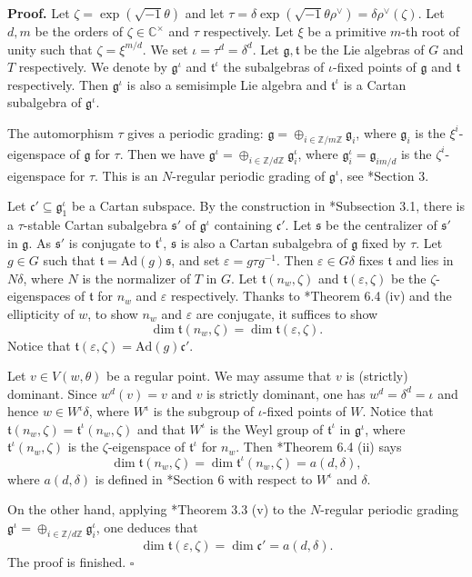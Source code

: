 \documentclass[10pt,leqno]{article}
\newcommand{\qed}{\hfill $\square$ \medskip}
\newenvironment{proof}[1][Proof]{\noindent\textbf{#1.} }{\qed}
\newcommand{\Ad}{\text{Ad}}
\renewcommand{\t}{\mathfrak t}
\def\fg{\mathfrak g}
\def\fc{\mathfrak c}
\def\ft{\mathfrak t}
\def\fs{\mathfrak s}
\def\d{\delta}
\def\t{\tau}
\def\z{\zeta}
\def\i{^{-1}}
\begin{document}
\begin{proof} Let $\zeta=\exp(\sqrt{-1} \theta)$ and let
$\t=\delta \exp(\sqrt{-1} \theta \rho^\vee)=\delta \rho^\vee(\zeta)$. Let $d,m$ be
the orders of $\zeta \in \mathbb C^\times$ and $\t$ respectively.
Let $\xi$ be a primitive $m$-th root of unity such that
$\zeta=\xi^{m/d}$. We set $\iota=\tau^d=\delta^d$. Let $\fg, \ft$ be
the Lie algebras of $G$ and $T$ respectively. We denote by
$\fg^\iota$ and $\ft^\iota$ the subalgebras of $\iota$-fixed points
of $\fg$ and $\ft$ respectively. Then $\fg^\iota$ is also a
semisimple Lie algebra and $\ft^\iota$ is a Cartan subalgebra of
$\fg^\iota$.

	The automorphism $\t$ gives a periodic grading: $\fg=\oplus_{i
\in \mathbb Z/m\mathbb Z} \fg_i$, where $\fg_i$ is the
$\xi^i$-eigenspace of $\fg$ for $\t$. Then we have $\fg^\iota =
\oplus_{i \in \mathbb Z / d\mathbb Z} \fg^\iota_i$, where
$\fg^\iota_i=\fg_{im/d}$ is the $\zeta^i$-eigenspace for $\t$. This is
an $N$-regular periodic grading of ${\fg}^{\iota}$, see
\cite{panyushev}*{Section 3}.
	
Let $\fc' \subseteq \fg^\iota_1$ be a Cartan subspace. By the
construction in \cite{rgly}*{Subsection 3.1}, there is a $\t$-stable
Cartan subalgebra $\fs'$ of $\fg^\iota$ containing $\fc'$. Let $\fs$
be the centralizer of $\fs'$ in $\fg$. As $\fs'$ is conjugate to
$\ft^\iota$, $\fs$ is also a Cartan subalgebra of $\fg$ fixed by
$\t$. Let $g \in G$ such that $\ft=\Ad(g) \fs$, and set $\varepsilon=g
\t g\i$. Then $\varepsilon \in G \d$ fixes $\ft$ and lies in $N \d$,
where $N$ is the normalizer of $T$ in $G$. Let $\ft(n_w, \z)$ and
$\ft(\varepsilon, \z)$ be the $\z$-eigenspaces of $\ft$ for $n_w$ and
$\varepsilon$ respectively. Thanks to
\cite{springer_regular}*{Theorem 6.4 (iv)} and
the ellipticity of $w$, to show $n_w$ and $\varepsilon$ are conjugate,
it suffices to show $$\dim \ft(n_w, \z)= \dim \ft(\varepsilon, \z).$$
Notice that $\ft(\varepsilon, \z)=\Ad(g) \fc'$.
	
	Let $v \in V(w, \theta)$ be a regular point. We may assume
that $v$ is (strictly) dominant. Since $w^d(v)=v$ and $v$ is strictly
dominant, one has $w^d=\d^d=\iota$ and hence $w \in W^\iota \d$, where
$W^\iota$ is the subgroup of $\iota$-fixed points of $W$. Notice that
$\ft(n_w, \z)=\ft^\iota(n_w, \z)$ and that $W^\iota$ is the Weyl group
of $\ft^\iota$ in $\fg^\iota$, where $\ft^\iota(n_w, \z)$ is the
$\z$-eigenspace of $\ft^\iota$ for $n_w$. Then
\cite{springer_regular}*{Theorem 6.4 (ii)} says $$\dim \ft(n_w, \z) = \dim \ft^\iota(n_w, \z)=
a(d, \d),$$ where $a(d, \d)$ is defined in
\cite{springer_regular}*{Section 6} with
respect to $W^\iota$ and $\d$.
	
	On the other hand, applying \cite{panyushev}*{Theorem 3.3 (v)} to the
$N$-regular periodic grading $\fg^\iota = \oplus_{i \in \mathbb Z /
d\mathbb Z} \fg^\iota_i$, one deduces that $$\dim \ft(\varepsilon, \z)
= \dim \fc' = a(d, \d).$$ The proof is finished.
\end{proof}
\end{document}
